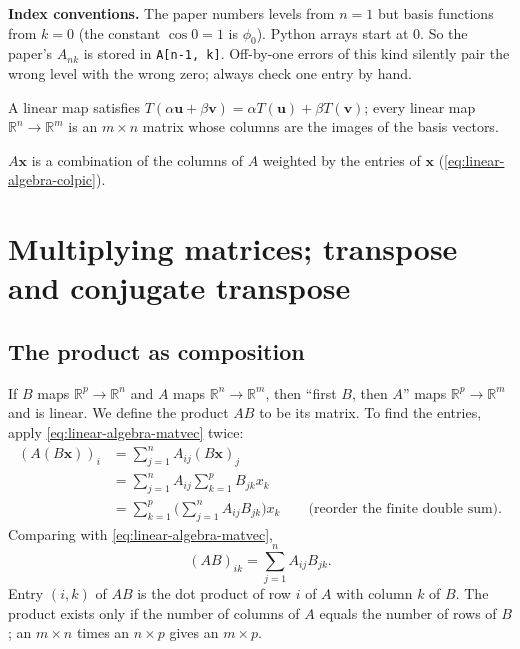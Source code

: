\begin{pitfall}
\textbf{Index conventions.} The paper numbers levels from $n=1$ but basis functions from $k=0$ (the constant $\cos0=1$ is $\phi_0$). Python arrays start at $0$. So the paper's $A_{nk}$ is stored in \texttt{A[n-1, k]}. Off-by-one errors of this kind silently pair the wrong level with the wrong zero; always check one entry by hand.
\end{pitfall}

\begin{keyideas}
\item A linear map satisfies $T(\alpha\bm u+\beta\bm v)=\alpha T(\bm u)+\beta T(\bm v)$; every linear map $\mathbb R^n\to\mathbb R^m$ is an $m\times n$ matrix whose columns are the images of the basis vectors.
\item $A\bm x$ is a combination of the columns of $A$ weighted by the entries of $\bm x$ (\cref{eq:linear-algebra-colpic}).
\end{keyideas}

\section{Multiplying matrices; transpose and conjugate transpose}\label{sec:linear-algebra-mult}

\subsection{The product as composition}

If $B$ maps $\mathbb R^p\to\mathbb R^n$ and $A$ maps $\mathbb R^n\to\mathbb R^m$, then ``first $B$, then $A$'' maps $\mathbb R^p\to\mathbb R^m$ and is linear. We define the product $AB$ to be its matrix. To find the entries, apply \cref{eq:linear-algebra-matvec} twice:
\begin{align*}
(A(B\bm x))_i&=\sum_{j=1}^nA_{ij}(B\bm x)_j\\
&=\sum_{j=1}^nA_{ij}\sum_{k=1}^pB_{jk}x_k\\
&=\sum_{k=1}^p\Big(\sum_{j=1}^nA_{ij}B_{jk}\Big)x_k\qquad\text{(reorder the finite double sum)}.
\end{align*}
Comparing with \cref{eq:linear-algebra-matvec},
\begin{equation}
(AB)_{ik}=\sum_{j=1}^nA_{ij}B_{jk}.
\label{eq:linear-algebra-matmul}
\end{equation}
Entry $(i,k)$ of $AB$ is the dot product of row $i$ of $A$ with column $k$ of $B$. The product exists only if the number of columns of $A$ equals the number of rows of $B$; an $m\times n$ times an $n\times p$ gives an $m\times p$.

